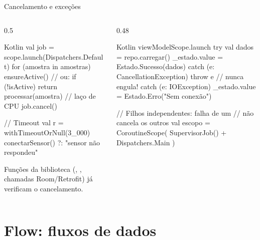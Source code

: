 \documentclass[aspectratio=169,10pt]{beamer}
\begin{document}
\begin{frame}[fragile]{Cancelamento e exceções}
  \begin{columns}[T]
    \begin{column}{0.5\textwidth}
\begin{codigo}[title=Cancelamento é cooperativo]{Kotlin}
val job = scope.launch(Dispatchers.Default) {
  for (amostra in amostras) {
    ensureActive()      // ou: if (!isActive) return
    processar(amostra)  // laço de CPU
  }
}
job.cancel()

// Timeout
val r = withTimeoutOrNull(3_000) {
  conectarSensor()
} ?: "sensor não respondeu"
\end{codigo}
      \begin{dica}
        Funções da biblioteca (, , chamadas Room/Retrofit) já verificam o cancelamento.
      \end{dica}
    \end{column}
    \begin{column}{0.48\textwidth}
\begin{codigo}[title=Tratando falhas]{Kotlin}
viewModelScope.launch {
  try {
    val dados = repo.carregar()
    _estado.value = Estado.Sucesso(dados)
  } catch (e: CancellationException) {
    throw e           // nunca engula!
  } catch (e: IOException) {
    _estado.value = Estado.Erro("Sem conexão")
  }
}

// Filhos independentes: falha de um
// não cancela os outros
val escopo = CoroutineScope(
  SupervisorJob() + Dispatchers.Main
)
\end{codigo}
    \end{column}
  \end{columns}
\end{frame}

\section{Flow: fluxos de dados}
\end{document}
